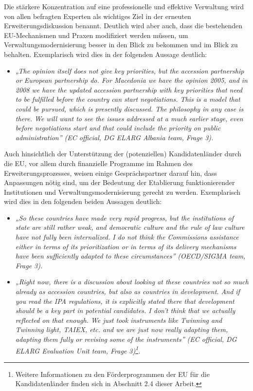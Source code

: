 Die stärkere Konzentration auf eine professionelle und effektive Verwaltung wird von allen befragten Experten als wichtiges Ziel in der erneuten Erweiterungsdiskussion benannt. Deutlich wird aber auch, dass die bestehenden EU-Mechanismen und Praxen modifiziert werden müssen, um Verwaltungsmodernisierung besser in den Blick zu bekommen und im Blick zu behalten. Exemplarisch wird dies in der folgenden Aussage deutlich: 
\begin{itemize}[label={}]
\item \textit{„The opinion itself does not give key priorities, but the accession partnership or European partnership do. For Macedonia we have the opinion 2005, and in 2008 we have the updated accession partnership with key priorities that need to be fulfilled before the country can start negotiations. This is a model that could be pursued, which is presently discussed. The philosophy in any case is there. We will want to see the issues addressed at a much earlier stage, even before negotiations start and that could include the priority on public administration” (EC official, DG ELARG Albania team, Frage 3). }\end{itemize}
Auch hinsichtlich der Unterstützung der (potenziellen) Kandidatenländer durch die EU, vor allem durch finanzielle Programme im Rahmen des Erweiterungsprozesses, weisen einige Gesprächspartner darauf hin, dass Anpassungen nötig sind, um der Bedeutung der Etablierung funktionierender Institutionen und Verwaltungsmodernisierung gerecht zu werden. Exemplarisch wird dies in den folgenden beiden Aussagen deutlich:
\begin{itemize}[label={}]
\item \textit{„So these countries have made very rapid progress, but the institutions of state are still rather weak, and democratic culture and the rule of law culture have not fully been internalized. I do not think the Commissions assistance either in terms of its prioritization or in terms of its delivery mechanisms have been sufficiently adapted to these circumstances” (OECD/SIGMA team, Frage 3).}
\item \textit{„Right now, there is a discussion about looking at these countries not so much already as accession countries, but also as countries in development. And if you read the IPA regulations, it is explicitly stated there that development should be a key part in potential candidates. I don’t think that we actually reflected on that enough. We just took instruments like Twinning and Twinning light, TAIEX, etc. and we are just now really adapting them, adapting them fully or revising some of the instruments” (EC official, DG ELARG Evaluation Unit team, Frage 3)\footnote{Weitere Informationen zu den Förderprogrammen der EU für die Kandidatenländer finden sich in Abschnitt 2.4 dieser Arbeit.}.} 
\end{itemize}
